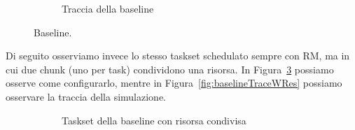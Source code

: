 \begin{figure}[htbp]
\begin{subfigure}{0.45\textwidth}
        \caption{Traccia della baseline}
        \label{fig:baselineTrace}
        \vfill
    \end{subfigure}
    \caption{Baseline.}
\end{figure}

\myskip

Di seguito osserviamo invece lo stesso taskset schedulato sempre con RM, ma in cui due chunk (uno per task) condividono una risorsa. In Figura~\ref{fig:baselineTasksetWRes} possiamo osserve come configurarlo, mentre in Figura~\ref{fig:baselineTraceWRes} possiamo osservare la traccia della simulazione.

\begin{figure}[htbp]
    \centering
    \begin{subfigure}{0.45\textwidth}
        \vfill
        \centering
        \caption{Taskset della baseline con risorsa condivisa}
        \label{fig:baselineTasksetWRes}
        \vfill
    \end{subfigure}
    \hfill
    \begin{subfigure}{0.45\textwidth}
        \vfill
        \centering

\end{subfigure}
\end{figure}
